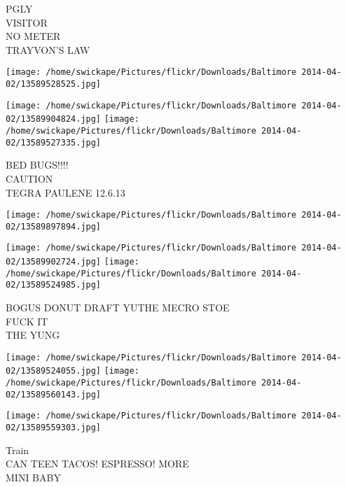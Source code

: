 \documentclass[10pt,letterpaper]{article}
\begin{document}
PGLY\\
VISITOR\\
NO METER\\
TRAYVON'S LAW
\pagebreak

\texttt{[image: /home/swickape/Pictures/flickr/Downloads/Baltimore 2014-04-02/13589528525.jpg]}

\vspace{0.25in}
\texttt{[image: /home/swickape/Pictures/flickr/Downloads/Baltimore 2014-04-02/13589904824.jpg]}
\texttt{[image: /home/swickape/Pictures/flickr/Downloads/Baltimore 2014-04-02/13589527335.jpg]}

BED BUGS!!!!\\
CAUTION\\
TEGRA PAULENE 12.6.13
\pagebreak

\texttt{[image: /home/swickape/Pictures/flickr/Downloads/Baltimore 2014-04-02/13589897894.jpg]}

\vspace{0.25in}
\texttt{[image: /home/swickape/Pictures/flickr/Downloads/Baltimore 2014-04-02/13589902724.jpg]}
\texttt{[image: /home/swickape/Pictures/flickr/Downloads/Baltimore 2014-04-02/13589524985.jpg]}

BOGUS DONUT DRAFT YUTHE MECRO STOE\\
FUCK IT\\
THE YUNG
\pagebreak

\texttt{[image: /home/swickape/Pictures/flickr/Downloads/Baltimore 2014-04-02/13589524055.jpg]}
\texttt{[image: /home/swickape/Pictures/flickr/Downloads/Baltimore 2014-04-02/13589560143.jpg]}

\texttt{[image: /home/swickape/Pictures/flickr/Downloads/Baltimore 2014-04-02/13589559303.jpg]}

Train\\
CAN TEEN TACOS! ESPRESSO! MORE\\
MINI BABY
\pagebreak
\end{document}
